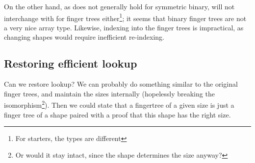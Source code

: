 On the other hand, as
does not generally hold for symmetric binary,  will not interchange with  for finger trees either\footnote{For starters, the types are different}; it seems that binary finger trees are not a very nice array type. Likewise, indexing into the finger trees is impractical, as changing shapes would require inefficient re-indexing. 

\subsection{Restoring efficient lookup}
Can we restore lookup? We can probably do something similar to the original finger trees, and maintain the sizes internally (hopelessly breaking the isomorphism\footnote{Or would it stay intact, since the shape determines the size anyway?}). Then we could state that a fingertree of a given size is just a finger tree of a shape paired with a proof that this shape has the right size.

\begin{comment}
We would like to quotient the redundancy of the number type away, which would also alleviate our issues related to indexing.

We can do this by imposing the following relation on the numbers
\[ \dots \]
and turning the number system into a setoid. This ensures that numbers with equal interpretetations are related, e.g.,
\[ \dots \]
Eliminating from this setoid should then respect this relation, so for example, we have to prove
\[ \dots \]

Similarly, we can keep the implementation of the binary finger trees, but also put this under an appropriate relation
\[ \dots \]
which ensures that the construction of the trees respects the relation on the number as well.
\end{comment}